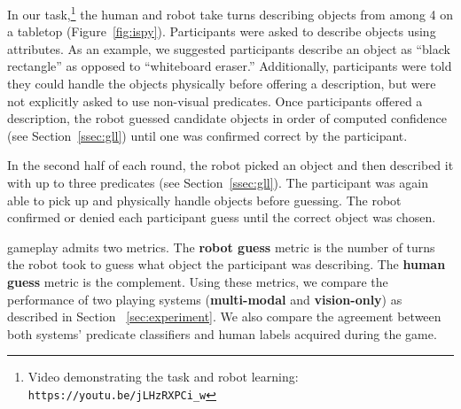 In our \ispy task,\footnote{Video demonstrating the \ispy task and robot learning: \texttt{https://youtu.be/jLHzRXPCi\_w}} the human and robot take turns describing objects from among 4 on a tabletop (Figure~\ref{fig:ispy}).
Participants were asked to describe objects using attributes.
As an example, we suggested participants describe an object as ``black rectangle'' as opposed to ``whiteboard eraser.''
Additionally, participants were told they could handle the objects physically before offering a description, but were not explicitly asked to use non-visual predicates.
Once participants offered a description, the robot guessed candidate objects in order of computed confidence (see Section~\ref{ssec:gll}) until one was confirmed correct by the participant.

In the second half of each round, the robot picked an object and then described it with up to three predicates (see Section~\ref{ssec:gll}).
The participant was again able to pick up and physically handle objects before guessing.
The robot confirmed or denied each participant guess until the correct object was chosen.

\ispy gameplay admits two metrics.
The \textbf{robot guess} metric is the number of turns the robot took to guess what object the participant was describing.
The \textbf{human guess} metric is the complement.
Using these metrics, we compare the performance of two \ispy playing systems (\textbf{multi-modal} and \textbf{vision-only}) as described in Section ~\ref{sec:experiment}.
We also compare the agreement between both systems' predicate classifiers and human labels acquired during the game.